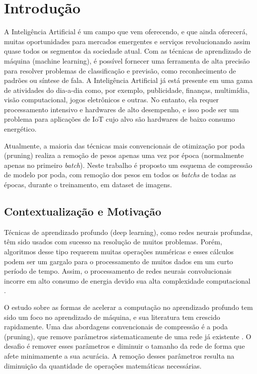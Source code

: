 \chapter[Introdução]{Introdução}
\label{ch:introdução}

A Inteligência Artificial é um campo que vem oferecendo, e que ainda oferecerá, muitas oportunidades para mercados emergentes e serviços revolucionando assim quase todos os segmentos da sociedade atual. Com as técnicas de aprendizado de máquina (machine learning), é possível fornecer uma ferramenta de alta precisão para resolver problemas de classificação e previsão, como reconhecimento de padrões ou síntese de fala. A Inteligência Artificial já está presente em uma gama de atividades do dia-a-dia como, por exemplo, publicidade, finanças, multimídia, visão computacional, jogos eletrônicos e outras. No entanto, ela requer processamento intensivo e hardwares de alto desempenho, e isso pode ser um problema para aplicações de IoT cujo alvo são hardwares de baixo consumo energético. 

Atualmente, a maioria das técnicas mais convencionais de otimização por poda (pruning) realiza a remoção de pesos apenas uma vez por época (normalmente apenas no primeiro \textit{batch}). Neste trabalho é proposto um esquema de compressão de modelo por poda, com remoção dos pesos em todos os \textit{batchs} de todas as épocas, durante o treinamento, em dataset de imagens.

\section{Contextualização e Motivação}
Técnicas de aprendizado profundo (deep learning), como redes neurais profundas, têm sido usados com sucesso na resolução de muitos problemas. Porém, algoritmos desse tipo requerem muitas operações numéricas e esses cálculos podem ser um gargalo para o processamento de muitos dados em um curto período de tempo. Assim, o processamento de redes neurais convolucionais incorre em alto consumo de energia devido sua alta complexidade computacional \cite{nvidea2015}.

O estudo sobre as formas de acelerar a computação no aprendizado profundo tem sido um foco no aprendizado de máquina, e sua literatura tem crescido rapidamente. Uma das abordagens convencionais de compressão é a poda (pruning), que remove parâmetros sistematicamente de uma rede já existente \cite{blalock2020}. O desafio é remover esses parâmetros e diminuir o tamanho da rede de forma que afete minimamente a sua acurácia. A remoção desses parâmetros resulta na diminuição da quantidade de operações matemáticas necessárias.


